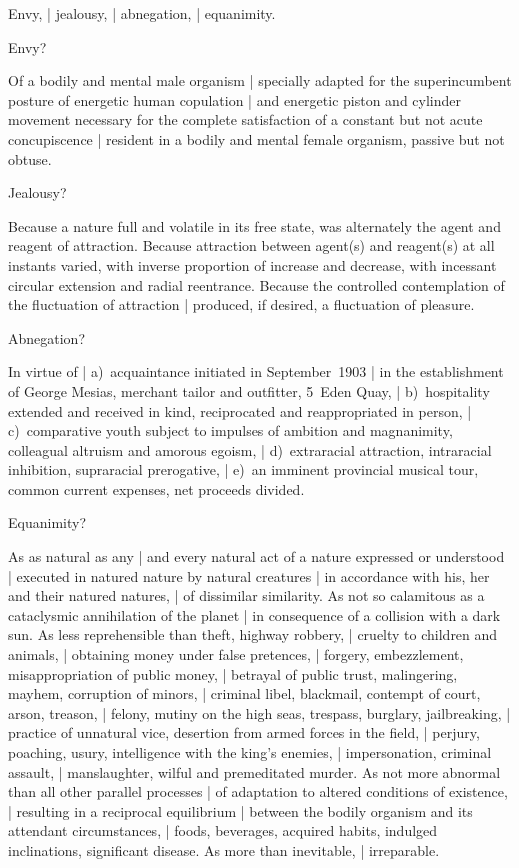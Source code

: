\Philosophy
Envy, |
jealousy, |
abnegation, |
equanimity.


Envy?

\Science
Of a bodily and mental male organism |
specially adapted for the superincumbent posture
of energetic human copulation |
and energetic piston and cylinder movement
necessary for the complete satisfaction
of a constant but not acute concupiscence |
resident in a bodily and mental female organism,
passive but not obtuse.


Jealousy?

\Science
Because a nature full and volatile in its free state,
was alternately the agent and reagent of attraction.
Because attraction between agent(s) and reagent(s) at all instants varied,
with inverse proportion of increase and decrease,
with incessant circular extension and radial reentrance.
Because the controlled contemplation
of the fluctuation of attraction |
produced, if desired,
a fluctuation of pleasure.


Abnegation?

\Poetry[~(emotion)]
In virtue of |
a)~acquaintance initiated in September~1903 |
in the establishment of George Mesias,
merchant tailor and outfitter, 5~Eden Quay, |
b)~hospitality extended and received in kind,
reciprocated and reappropriated in person, |
c)~comparative youth subject to impulses of ambition and magnanimity,
colleagual altruism and amorous egoism, |
d)~extraracial attraction, intraracial inhibition, supraracial prerogative, |
e)~an imminent provincial musical tour, common current expenses,
net proceeds divided.


Equanimity?

\Turns
As as natural as any |
and every natural act of a nature expressed or understood |
executed in natured nature by natural creatures |
in accordance with his, her and their natured natures, |
of dissimilar similarity.
As not so calamitous as a cataclysmic annihilation of the planet |
in consequence of a collision with a dark sun.
As less reprehensible than theft, highway robbery, |
cruelty to children and animals, |
obtaining money under false pretences, |
forgery, embezzlement, misappropriation of public money, |
betrayal of public trust, malingering, mayhem, corruption of minors, |
criminal libel, blackmail, contempt of court, arson, treason, |
felony, mutiny on the high seas, trespass, burglary, jailbreaking, |
practice of unnatural vice, desertion from armed forces in the field, |
perjury, poaching, usury, intelligence with the king's enemies, |
impersonation, criminal assault, |
manslaughter, wilful and premeditated murder.
As not more abnormal than all other parallel processes |
of adaptation to altered conditions of existence, |
resulting in a reciprocal equilibrium |
between the bodily organism and its attendant circumstances, |
foods, beverages, acquired habits,
indulged inclinations, significant disease.
As more than inevitable, |
irreparable.


